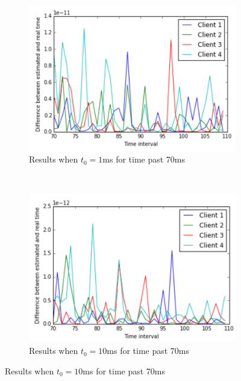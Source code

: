 \documentclass[10pt, journal, letter, onecolumn]{IEEEtran}
\begin{document}
\begin{figure}
\begin{subfigure}[b]{0.45\textwidth}
\centering
\includegraphics[scale=0.5]{figures/figure5}
\caption{Results when $t_0 = 1$ms for time past 70ms}
\label{fig:results2_1ms}
\end{subfigure}~
\begin{subfigure}[b]{0.45\textwidth}
\centering
\includegraphics[scale=0.5]{figures/figure6}
\caption{Results when $t_0 = 10$ms for time past 70ms}
\label{fig:results2_10ms}
\end{subfigure}
\label{fig:results2}
\end{figure}




\end{document}
